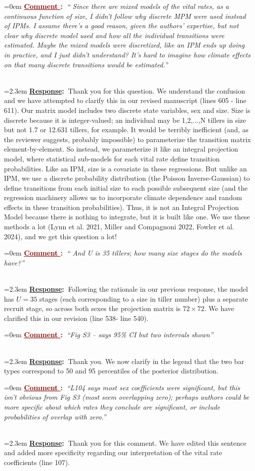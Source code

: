 \documentclass[12pt]{article}
\newcounter{cN}
\newcommand{\comment}[1]{
	\vspace{2em}
	\refstepcounter{cN} %
	\noindent \hangindent=0em \textbf{\textcolor{Maroon}{\uline{Comment \thecN}:~}}\emph{``#1''}
	}
\newcommand{\response}[1]{
	\\[0.25em]
	\hangindent=2.3em \textbf{\textcolor{NavyBlue}{\uline{Response}:~}}#1
	}
\begin{document}
\comment{ Since there are mixed models of the vital rates, as a continuous function of size, I didn’t follow why discrete MPM were used instead of IPMs. I assume there’s a good reason, given the authors’ expertise, but not clear why discrete model used and how all the individual transitions were estimated. Maybe the mixed models were discretized, like an IPM ends up doing in practice, and I just didn’t understand? It’s hard to imagine how climate effects on that many discrete transitions would be estimated.}
\response{Thank you for this question. We understand the confusion and we have attempted to clarify this in our revised manuscript (lines 605 - line 611).
Our matrix model includes two discrete state variables, sex and size. 
Size is discrete because it is integer-valued; an individual may be 1,2,...,N tillers in size but not 1.7 or 12.631 tillers, for example. 
It would be terribly inefficient (and, as the reviewer suggests, probably impossible) to parameterize the transition matrix element-by-element. 
So instead, we parameterize it like an integral projection model, where statistical sub-models for each vital rate define transition probabilities. 
Like an IPM, size is a covariate in these regressions. 
But unlike an IPM, we use a discrete probability distribution (the Poisson Inverse-Gaussian) to define transitions from each initial size to each possible subsequent size (and the regression machinery allows us to incorporate climate dependence and random effects in these transition probabilities). 
Thus, it is not an Integral Projection Model because there is nothing to integrate, but it is built like one. 
We use these methods a lot (Lynn et al. 2021, Miller and Compagnoni 2022, Fowler et al. 2024), and we get this question a lot!
}

\comment{ And U is 35 tillers; how many size stages do the models have?}
\response{Following the rationale in our previous response, the model has $U=35$ stages (each corresponding to a size in tiller number) plus a separate recruit stage, so across both sexes the projection matrix is $72 \times 72$. We have clarified this in our revision (line 538- line 540).}

\comment{Fig S3 – says 95\% CI but two intervals shown}
\response{Thank you. We now clarify in the legend that the two bar types correspond to 50 and 95 percentiles of the posterior distribution.}

\comment{L104 says most sex coefficients were significant, but this isn’t obvious from Fig S3 (most seem overlapping zero); perhaps authors could be more specific about which rates they conclude are significant, or include probabilities of overlap with zero.}
\response{Thank you for  this comment.
We have edited this sentence and added more specificity regarding our interpretation of the vital rate coefficients (line 107).}
\end{document}
